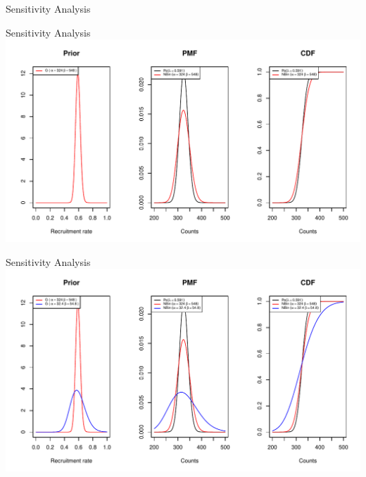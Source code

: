 \documentclass[english]{beamer}\usepackage[]{graphicx}\usepackage[]{xcolor}
\makeatletter
\def\maxwidth{ %
  \ifdim\Gin@nat@width>\linewidth
    \linewidth
  \else
    \Gin@nat@width
  \fi
}
\newenvironment{knitrout}{}{} %
\makeatother
\begin{document}
\begin{frame}{Sensitivity Analysis}


\end{frame}


\begin{frame}{Sensitivity Analysis}
\begin{knitrout}
\color{fgcolor}
\includegraphics[width=\maxwidth]{figures/figunnamed-chunk-11-1} 
\end{knitrout}

\end{frame}


\begin{frame}{Sensitivity Analysis}
\begin{knitrout}
\color{fgcolor}
\includegraphics[width=\maxwidth]{figures/figunnamed-chunk-12-1} 
\end{knitrout}

\end{frame}
\end{document}
